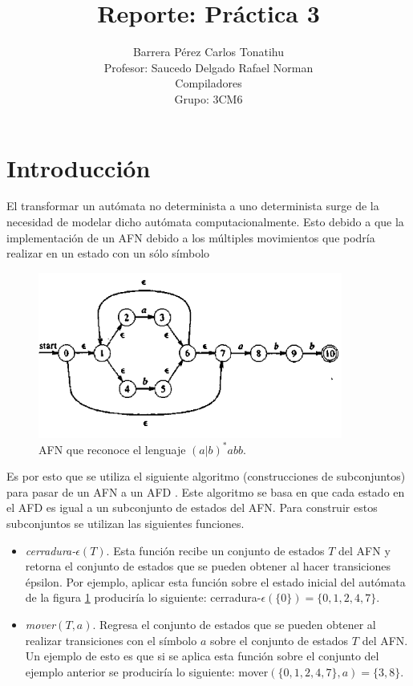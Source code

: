 \documentclass[titlepage]{article}
\title{Reporte: Práctica 3}
\author{Barrera Pérez Carlos Tonatihu \\ Profesor: Saucedo Delgado Rafael Norman \\ Compiladores \\ Grupo: 3CM6 }
\begin{document}
\maketitle
\tableofcontents
\newpage
\section{Introducción}
El transformar un autómata no determinista a uno determinista surge de la necesidad de modelar dicho autómata computacionalmente. Esto debido a que la implementación de un AFN debido a los múltiples movimientos que podría realizar en un estado con un sólo símbolo
\begin{figure}[H]
        \begin{center}
        \includegraphics[width=10cm]{AFN.png}
        \caption{AFN que reconoce el lenguaje $(a|b)^{*}abb$.}
        \label{fig:AFN}
        \end{center}
    \end{figure}
Es por esto que se utiliza el siguiente algoritmo (construcciones de subconjuntos) para pasar de un AFN a un AFD \cite{compis}. Este algoritmo se basa en que cada estado en el AFD es igual a un subconjunto de estados del AFN. Para construir estos subconjuntos se utilizan las siguientes funciones.
\begin{itemize}
	\item \emph{cerradura-$\epsilon(T)$}. Esta función recibe un conjunto de estados $T$ del AFN y retorna el conjunto de estados que se pueden obtener al hacer transiciones épsilon. Por ejemplo, aplicar esta función sobre el estado inicial del autómata de la figura \ref{fig:AFN} produciría lo siguiente: cerradura-$\epsilon(\{0\}) = \{0, 1, 2, 4, 7\}$.
	
	\item \emph{mover$(T, a)$}. Regresa el conjunto de estados que se pueden obtener al realizar transiciones con el símbolo $a$ sobre el conjunto de estados $T$ del AFN. Un ejemplo de esto es que si se aplica esta función sobre el conjunto del ejemplo anterior se produciría lo siguiente: mover$(\{0, 1, 2, 4, 7\}, a) = \{3, 8\}$.
\end{itemize}
\end{document}
